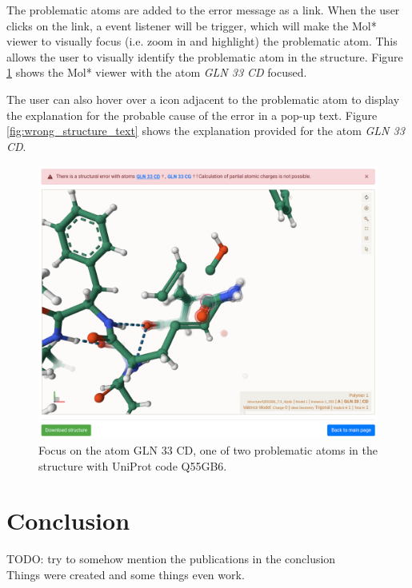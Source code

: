 \documentclass[
  digital,     %
  oneside,     %
  nosansbold,  %
  nocolorbold, %
  lof,         %
  lot,         %
]{fithesis4}
\begin{document}
The problematic atoms are added to the error message as a link. When the user clicks on the link, a event listener will be trigger, which will make the Mol* viewer to visually focus (i.e. zoom in and highlight) the problematic atom. This allows the user to visually identify the problematic atom in the structure. Figure \ref{fig:wrong_structure_focus} shows the Mol* viewer with the atom \textit{GLN 33 CD} focused.

The user can also hover over a icon adjacent to the problematic atom to display the explanation for the probable cause of the error in a pop-up text. Figure \ref{fig:wrong_structure_text} shows the explanation provided for the atom \textit{GLN 33 CD}.

\begin{figure}[htbp]
  \begin{center}
    \includegraphics[width=12cm]{figures/wrong_structure_focus.png}
  \end{center}
  \caption{Focus on the atom GLN 33 CD, one of two problematic atoms in the structure with UniProt code Q55GB6.}
  \label{fig:wrong_structure_focus}
\end{figure}

\chapter*{Conclusion}

TODO: try to somehow mention the publications in the conclusion \\

Things were created and some things even work.

\printbibliography[heading=bibintoc]
\end{document}

